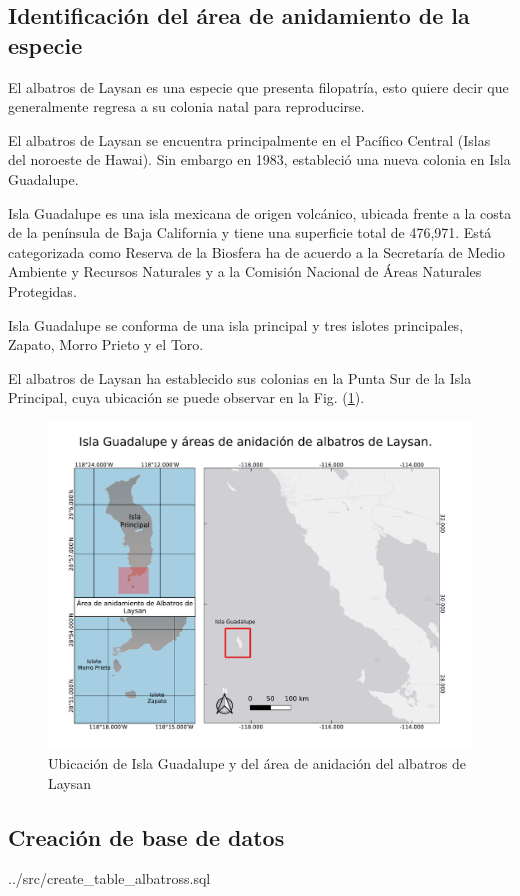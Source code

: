 \subsection{Identificación del área de anidamiento de la especie}

El albatros de Laysan es una especie que presenta filopatría, esto quiere decir
que generalmente regresa a su colonia natal para reproducirse.

El albatros de Laysan se encuentra principalmente en el Pacífico Central (Islas
del noroeste de Hawai). Sin embargo en 1983, estableció una nueva colonia en
Isla Guadalupe.

Isla Guadalupe es una isla mexicana de origen volcánico, ubicada frente a la
costa de la península de Baja California y tiene una superficie total de
476,971. Está categorizada como Reserva de la Biosfera ha de acuerdo a la
Secretaría de Medio Ambiente y Recursos Naturales y a la Comisión Nacional de
Áreas Naturales Protegidas.

Isla Guadalupe se conforma de una isla principal y tres islotes principales,
Zapato, Morro Prieto y el Toro.

El albatros de Laysan ha establecido sus colonias en la Punta Sur de la Isla
Principal, cuya ubicación se puede observar en la Fig.
(\ref{fig:ubicacionIslaGpe}).

\begin{figure}[h!]
    \includegraphics[scale=0.60]{figures/Isla Guadalupe.pdf}
    \caption{Ubicación de Isla Guadalupe y del área de anidación del albatros de Laysan}
    \label{fig:ubicacionIslaGpe}
    \centering
\end{figure}

\subsection{Creación de base de datos}

 {../src/create_table_albatross.sql}
